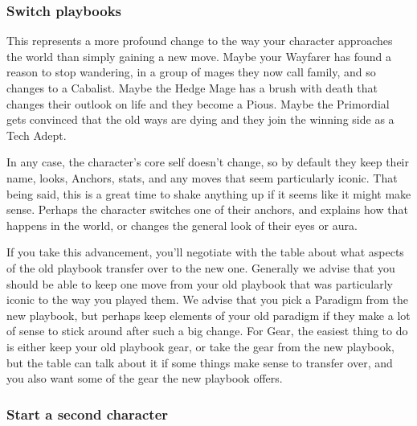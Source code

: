 \documentclass[
  oneside,
  statementpaper,
  9pt]{memoir}
\begin{document}
\hypertarget{switch-playbooks}{%
\subsubsection{Switch playbooks}\label{switch-playbooks}}

\begin{Player}

This represents a more profound change to the way your character approaches the world than simply gaining a new move. Maybe your Wayfarer has found a reason to stop wandering, in a group of mages they now call family, and so changes to a Cabalist. Maybe the Hedge Mage has a brush with death that changes their outlook on life and they become a Pious. Maybe the Primordial gets convinced that the old ways are dying and they join the winning side as a Tech Adept.

In any case, the character’s core self doesn’t change, so by default they keep their name, looks, Anchors, stats, and any moves that seem particularly iconic. That being said, this is a great time to shake anything up if it seems like it might make sense. Perhaps the character switches one of their anchors, and explains how that happens in the world, or changes the general look of their eyes or aura.

If you take this advancement, you'll negotiate with the table about what aspects of the old playbook transfer over to the new one. Generally we advise that you should be able to keep one move from your old playbook that was particularly iconic to the way you played them. We advise that you pick a Paradigm from the new playbook, but perhaps keep elements of your old paradigm if they make a lot of sense to stick around after such a big change. For Gear, the easiest thing to do is either keep your old playbook gear, or take the gear from the new playbook, but the table can talk about it if some things make sense to transfer over, and you also want some of the gear the new playbook offers. 

\end{Player}

\hypertarget{start-a-second-character}{%
\subsubsection{Start a second
character}\label{start-a-second-character}}
\end{document}
